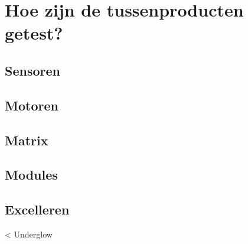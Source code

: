 \section{Hoe zijn de tussenproducten getest?}
\subsection{Sensoren}
\subsection{Motoren}
\subsection{Matrix}
\subsection{Modules}
\subsection{Excelleren} < Underglow